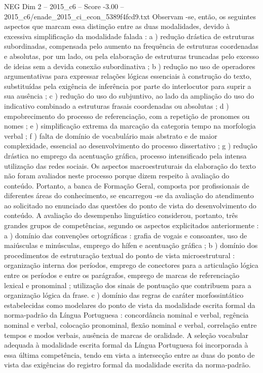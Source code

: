 \begin{textsample}{NEG Dim 2 – 2015\_c6 – Score -3.00 – 2015\_c6/enade\_2015\_ci\_econ\_5389f4fcd9.txt}
Observam -se, então, os seguintes aspectos que marcam essa distinção entre as duas modalidades, devido à excessiva simplificação da modalidade falada : a ) redução drástica de estruturas subordinadas, compensada pelo aumento na frequência de estruturas coordenadas e absolutas, por um lado, ou pela elaboração de estruturas truncadas pelo excesso de ideias sem a devida conexão subordinativa ; b ) redução no uso de operadores argumentativas para expressar relações lógicas essenciais à construção do texto, substituídas pela exigência de inferência por parte do interlocutor para suprir a sua ausência ; c ) redução do uso do subjuntivo, ao lado da ampliação do uso do indicativo combinado a estruturas frasais coordenadas ou absolutas ; d ) empobrecimento do processo de referenciação, com a repetição de pronomes ou nomes ; e ) simplificação extrema da marcação da categoria tempo na morfologia verbal ; f ) falta de domínio de vocabulário mais abstrato e de maior complexidade, essencial ao desenvolvimento do processo dissertativo ; g ) redução drástica no emprego da acentuação gráfica, processo intensificado pela intensa utilização das redes sociais.
Os aspectos macroestruturais da elaboração do texto não foram avaliados neste processo porque dizem respeito à avaliação do conteúdo.
Portanto, a banca de Formação Geral, composta por profissionais de diferentes áreas do conhecimento, se encarregou -se da avaliação do atendimento ao solicitado no enunciado das questões do ponto de vista do desenvolvimento do conteúdo.
A avaliação do desempenho linguístico considerou, portanto, três grandes grupos de competências, segundo os aspectos explicitados anteriormente : a ) domínio das convenções ortográficas : grafia de vogais e consoantes, uso de maiúsculas e minúsculas, emprego do hífen e acentuação gráfica ; b ) domínio dos procedimentos de estruturação textual do ponto de vista microestrutural : organização interna dos períodos, emprego de conectores para a articulação lógica entre os períodos e entre os parágrafos, emprego de marcas de referenciação lexical e pronominal ; utilização dos sinais de pontuação que contribuem para a organização lógica da frase. c ) domínio das regras de caráter morfossintático estabelecidas como modelares do ponto de vista da modalidade escrita formal da norma-padrão da Língua Portuguesa : concordância nominal e verbal, regência nominal e verbal, colocação pronominal, flexão nominal e verbal, correlação entre tempos e modos verbais, ausência de marcas de oralidade.
A seleção vocabular adequada à modalidade escrita formal da Língua Portuguesa foi incorporada à essa última competência, tendo em vista a intersecção entre as duas do ponto de vista das exigências do registro formal da modalidade escrita da norma-padrão.

\end{textsample}
